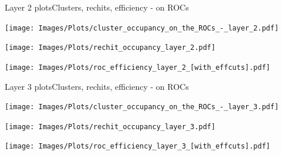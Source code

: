 \documentclass{beamer}
\begin{document}
\begin{frame}{Layer 2 plots}{Clusters, rechits, efficiency - on ROCs}
  \hspace{0.01\textwidth}%
  \begin{minipage}{0.32\textwidth}
    \centering
    \texttt{[image: Images/Plots/cluster\_occupancy\_on\_the\_ROCs\_-\_layer\_2.pdf]}
  \end{minipage}%
  \hspace{0.01\textwidth}%
  \begin{minipage}{0.32\textwidth}
    \centering
    \texttt{[image: Images/Plots/rechit\_occupancy\_layer\_2.pdf]}
  \end{minipage}%
  \vspace*{0.2cm}
  \hspace{0.01\textwidth}%
  \begin{minipage}{0.32\textwidth}
    \centering
    \texttt{[image: Images/Plots/roc\_efficiency\_layer\_2\_[with\_effcuts].pdf]}
  \end{minipage}
\end{frame}

\begin{frame}{Layer 3 plots}{Clusters, rechits, efficiency - on ROCs}
  \hspace{0.01\textwidth}%
  \begin{minipage}{0.32\textwidth}
    \centering
    \texttt{[image: Images/Plots/cluster\_occupancy\_on\_the\_ROCs\_-\_layer\_3.pdf]}
  \end{minipage}%
  \hspace{0.01\textwidth}%
  \begin{minipage}{0.32\textwidth}
    \centering
    \texttt{[image: Images/Plots/rechit\_occupancy\_layer\_3.pdf]}
  \end{minipage}%
  \vspace*{0.2cm}
  \hspace{0.01\textwidth}%
  \begin{minipage}{0.32\textwidth}
    \centering
    \texttt{[image: Images/Plots/roc\_efficiency\_layer\_3\_[with\_effcuts].pdf]}
  \end{minipage}
\end{frame}
\end{document}
